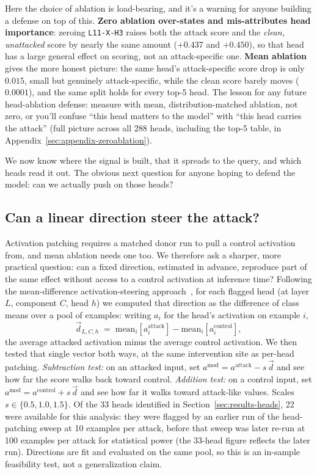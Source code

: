 \documentclass[11pt]{article}
\begin{document}
Here the choice of ablation is load-bearing, and it's a warning for
anyone building a defense on top of this. \textbf{Zero ablation
over-states and mis-attributes head importance}: zeroing
\texttt{L11-X-H3} raises both the attack score and the \emph{clean,
unattacked} score by nearly the same amount ($+0.437$ and $+0.450$), so
that head has a large general effect on scoring, not an attack-specific
one. \textbf{Mean ablation} gives the more honest picture: the same
head's attack-specific score drop is only $0.015$, small
but genuinely attack-specific, while the clean score barely moves
($0.0001$), and the same split holds for every top-5 head. The lesson
for any future head-ablation defense: measure with mean,
distribution-matched ablation, not zero, or you'll confuse ``this head
matters to the model'' with ``this head carries the attack'' (full
picture across all 288 heads, including the top-5 table, in
Appendix~\ref{sec:appendix-zeroablation}).

We now know where the signal is built, that it spreads to the query, and which
heads read it out. The obvious next question for anyone hoping to defend the
model: can we actually push on those heads?

\subsection{Can a linear direction steer the attack?}
\label{sec:results-meandiff}

Activation patching requires a matched donor run to pull a control
activation from, and mean ablation needs one too. We therefore ask a
sharper, more practical question: can a fixed direction, estimated in
advance, reproduce part of the same effect without access to a control
activation at inference time? Following the mean-difference
activation-steering approach~\citep{rimsky2024steering}, for each
flagged head (at layer $L$, component $C$, head $h$) we computed that
direction as the difference of class means over a pool of examples:
writing $a_i$ for the head's activation on example $i$,
\begin{equation}
\vec{d}_{L,C,h} \;=\;
\text{mean}_{i}\!\left[a^{\text{attack}}_{i}\right] -
\text{mean}_{i}\!\left[a^{\text{control}}_{i}\right],
\label{eq:meandiff}
\end{equation}
the average attacked activation minus the average control activation. We
then tested that single vector both ways, at the same intervention site
as per-head patching. \emph{Subtraction test:} on an attacked input, set
$a^{\text{mod}}=a^{\text{attack}}-s\,\vec{d}$ and see how far the score
walks back toward control. \emph{Addition test:} on a control input, set
$a^{\text{mod}}=a^{\text{control}}+s\,\vec{d}$ and see how far it walks
toward attack-like values. Scales $s\in\{0.5,1.0,1.5\}$. Of the 33 heads
identified in Section~\ref{sec:results-heads}, 22 were available for this
analysis: they were flagged by an earlier run of the head-patching sweep
at 10 examples per attack, before that sweep was later re-run at 100
examples per attack for statistical power (the 33-head figure reflects
the later run). Directions are fit and evaluated on the same pool, so
this is an in-sample feasibility test, not a generalization claim.
\end{document}
